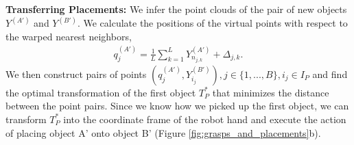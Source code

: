 \documentclass{article}
\newcommand{\pcx}[1]{\mathrm{X}^{(#1)}}
\begin{document}
\textbf{Transferring Placements:} We infer the point clouds of the pair of new objects $Y^{(A')}$ and $Y^{(B')}$. We calculate the positions of the virtual points with respect to the warped nearest neighbors,
\begin{align}
    q^{(A')}_j = \frac{1}{L} \sum_{k=1}^L Y^{(A')}_{n_{j,k}} + \Delta_{j,k}.
\end{align}
We then construct pairs of points $(q^{(A')}_j, Y^{(B')}_{i_j}), j \in \{1, ..., B\}, i_j \in I_P$ and find the optimal transformation of the first object $T^*_P$ that minimizes the distance between the point pairs. Since we know how we picked up the first object, we can transform $T^*_P$ into the coordinate frame of the robot hand and execute the action of placing object A' onto object B' (Figure \ref{fig:grasps_and_placements}b).





\end{document}
